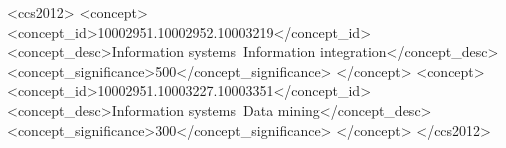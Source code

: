 \documentclass[acmsmall,natbib=false]{acmart}
\begin{document}

\begin{CCSXML}
<ccs2012>
   <concept>
       <concept_id>10002951.10002952.10003219</concept_id>
       <concept_desc>Information systems~Information integration</concept_desc>
       <concept_significance>500</concept_significance>
       </concept>
   <concept>
       <concept_id>10002951.10003227.10003351</concept_id>
       <concept_desc>Information systems~Data mining</concept_desc>
       <concept_significance>300</concept_significance>
       </concept>
 </ccs2012>
\end{CCSXML}





\maketitle
\end{document}
